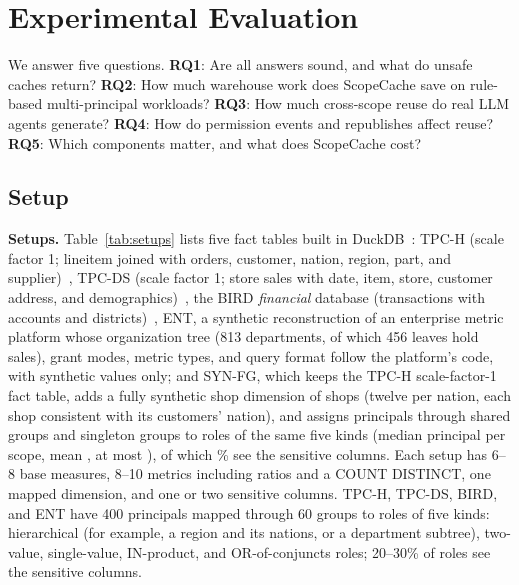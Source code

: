 \documentclass[sigconf, nonacm]{acmart}
\begin{document}
\section{Experimental Evaluation}
\label{sec:exp}

We answer five questions. \textbf{RQ1}: Are all answers sound, and what do unsafe caches return? \textbf{RQ2}: How much warehouse work does ScopeCache save on rule-based multi-principal workloads? \textbf{RQ3}: How much cross-scope reuse do real LLM agents generate? \textbf{RQ4}: How do permission events and republishes affect reuse? \textbf{RQ5}: Which components matter, and what does ScopeCache cost?

\subsection{Setup}
\label{sec:setup}

\textbf{Setups.} Table~\ref{tab:setups} lists five fact tables built in DuckDB~\cite{duckdb19}: TPC-H (scale factor 1; lineitem joined with orders, customer, nation, region, part, and supplier)~\cite{tpch}, TPC-DS (scale factor 1; store sales with date, item, store, customer address, and demographics)~\cite{tpcds02}, the BIRD \emph{financial} database (transactions with accounts and districts)~\cite{bird23}, ENT, a synthetic reconstruction of an enterprise metric platform whose organization tree (813 departments, of which 456 leaves hold sales), grant modes, metric types, and query format follow the platform's code, with synthetic values only; and SYN-FG, which keeps the TPC-H scale-factor-1 fact table, adds a fully synthetic shop dimension of \synfgShops{} shops (twelve per nation, each shop consistent with its customers' nation), and assigns \synfgUsers{} principals through \synfgSharedGroups{} shared groups and \synfgSingletons{} singleton groups to \synfgScopes{} roles of the same five kinds (median \synfgMedian{} principal per scope, mean \synfgMean{}, at most \synfgMax{}), of which \synfgSensitivePct\% see the sensitive columns. Each setup has 6--8 base measures, 8--10 metrics including ratios and a COUNT DISTINCT, one mapped dimension, and one or two sensitive columns. TPC-H, TPC-DS, BIRD, and ENT have 400 principals mapped through 60 groups to roles of five kinds: hierarchical (for example, a region and its nations, or a department subtree), two-value, single-value, IN-product, and OR-of-conjuncts roles; 20--30\% of roles see the sensitive columns.


\end{document}
